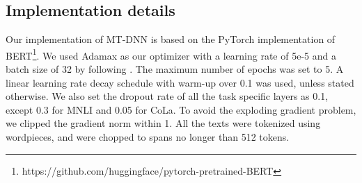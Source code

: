 \subsection{Implementation details}
\label{subsec:impl}
Our implementation of MT-DNN is based on the PyTorch implementation of BERT\footnote{https://github.com/huggingface/pytorch-pretrained-BERT}.
We used Adamax \cite{kingma2014adam} as our optimizer with a learning rate of 5e-5 and a batch size of 32 by following \citet{bert2018}. 
The maximum number of epochs was set to 5. 
A linear learning rate decay schedule with warm-up over 0.1 was used, unless stated otherwise. %
We also set the dropout rate of all the task specific layers as 0.1, except 0.3 for MNLI and 0.05 for CoLa. 
To avoid the exploding gradient problem, we clipped the gradient norm within 1. 
All the texts were tokenized using wordpieces, and were chopped to spans no longer than 512 tokens.


